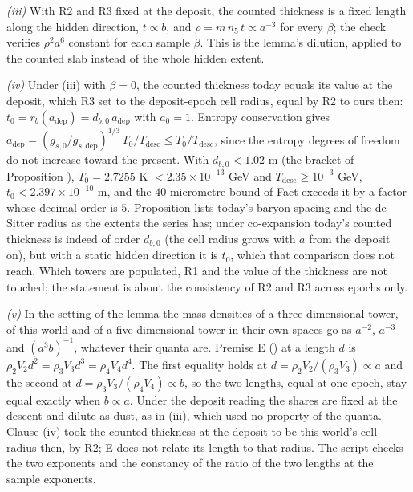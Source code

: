 \emph{(iii)} With R2 and R3 fixed at the deposit, the counted thickness is a fixed length along the hidden direction, $t \propto b$, and $\rho = m\,n_{5}\,t \propto a^{-3}$ for every $\beta$; the check verifies $\rho^{2}a^{6}$ constant for each sample $\beta$. This is the lemma's dilution, applied to the counted slab instead of the whole hidden extent.

\emph{(iv)} Under (iii) with $\beta = 0$, the counted thickness today equals its value at the deposit, which R3 set to the deposit-epoch cell radius, equal by R2 to ours then: $t_{0} = r_{b}(a_{\mathrm{dep}}) = d_{b,0}\,a_{\mathrm{dep}}$ with $a_{0} = 1$. Entropy conservation gives $a_{\mathrm{dep}} = (g_{s,0}/g_{s,\mathrm{dep}})^{1/3}\,T_{0}/T_{\mathrm{desc}} \le T_{0}/T_{\mathrm{desc}}$, since the entropy degrees of freedom do not increase toward the present. With $d_{b,0} < 1.02$ m (the bracket of Proposition ), $T_{0} = 2.7255$ K $< 2.35 \times 10^{-13}$ GeV and $T_{\mathrm{desc}} \ge 10^{-3}$ GeV, $t_{0} < 2.397 \times 10^{-10}$ m, and the $40$ micrometre bound of Fact  exceeds it by a factor whose decimal order is $5$. Proposition  lists today's baryon spacing and the de Sitter radius as the extents the series has; under co-expansion today's counted thickness is indeed of order $d_{b,0}$ (the cell radius grows with $a$ from the deposit on), but with a static hidden direction it is $t_{0}$, which that comparison does not reach. Which towers are populated, R1 and the value of the thickness are not touched; the statement is about the consistency of R2 and R3 across epochs only.

\emph{(v)} In the setting of the lemma the mass densities of a three-dimensional tower, of this world and of a five-dimensional tower in their own spaces go as $a^{-2}$, $a^{-3}$ and $(a^{3}b)^{-1}$, whatever their quanta are. Premise E () at a length $d$ is $\rho_{2}V_{2}d^{2} = \rho_{3}V_{3}d^{3} = \rho_{4}V_{4}d^{4}$. The first equality holds at $d = \rho_{2}V_{2}/(\rho_{3}V_{3}) \propto a$ and the second at $d = \rho_{3}V_{3}/(\rho_{4}V_{4}) \propto b$, so the two lengths, equal at one epoch, stay equal exactly when $b \propto a$. Under the deposit reading the shares are fixed at the descent and dilute as dust, as in (iii), which used no property of the quanta. Clause (iv) took the counted thickness at the deposit to be this world's cell radius then, by R2; E does not relate its length to that radius. The script checks the two exponents and the constancy of the ratio of the two lengths at the sample exponents.
